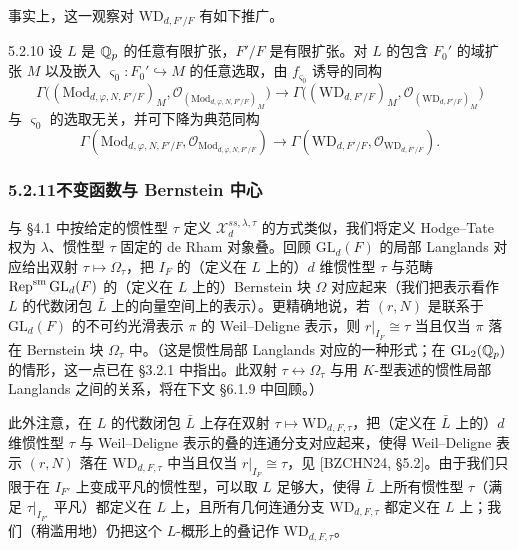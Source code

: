 事实上，这一观察对 $\mathrm{WD}_{d,F'/F}$ 有如下推广。

\begin{prop}{5.2.10}
设 $L$ 是 $\mathbb{Q}_p$ 的任意有限扩张，$F'/F$ 是有限扩张。对 $L$ 的包含 $F_0'$ 的域扩张 $M$ 以及嵌入 $\varsigma_0: F_0'\hookrightarrow M$ 的任意选取，由 $f_{\varsigma_0}$ 诱导的同构
\[
\Gamma\bigl((\mathrm{Mod}_{d,\varphi,N,F'/F})_M,\mathcal{O}_{(\mathrm{Mod}_{d,\varphi,N,F'/F})_M}\bigr)\longrightarrow\Gamma\bigl((\mathrm{WD}_{d,F'/F})_M,\mathcal{O}_{(\mathrm{WD}_{d,F'/F})_M}\bigr)
\]
与 $\varsigma_0$ 的选取无关，并可下降为典范同构
\[
\Gamma(\mathrm{Mod}_{d,\varphi,N,F'/F},\mathcal{O}_{\mathrm{Mod}_{d,\varphi,N,F'/F}})\longrightarrow\Gamma(\mathrm{WD}_{d,F'/F},\mathcal{O}_{\mathrm{WD}_{d,F'/F}}).
\]
\label{thm:a4-5-2-10}
\end{prop}

\subsubsection*{5.2.11\quad 不变函数与 Bernstein 中心}

与 §4.1 中按给定的惯性型 $\tau$ 定义 $\mathcal{X}^{ss,\lambda,\tau}_d$ 的方式类似，我们将定义 Hodge--Tate 权为 $\lambda$、惯性型 $\tau$ 固定的 de Rham 对象叠。回顾 $\mathrm{GL}_d(F)$ 的局部 Langlands 对应给出双射 $\tau\mapsto\Omega_\tau$，把 $I_F$ 的（定义在 $L$ 上的）$d$ 维惯性型 $\tau$ 与范畴 $\operatorname{Rep}^{\mathrm{sm}}\mathrm{GL}_d(F)$ 的（定义在 $L$ 上的）Bernstein 块 $\Omega$ 对应起来（我们把表示看作 $L$ 的代数闭包 $\bar L$ 上的向量空间上的表示）。更精确地说，若 $(r,N)$ 是联系于 $\mathrm{GL}_d(F)$ 的不可约光滑表示 $\pi$ 的 Weil--Deligne 表示，则 $r|_{I_F}\cong\tau$ 当且仅当 $\pi$ 落在 Bernstein 块 $\Omega_\tau$ 中。（这是惯性局部 Langlands 对应的一种形式；在 $\mathrm{GL}_2(\mathbb{Q}_p)$ 的情形，这一点已在 §3.2.1 中指出。此双射 $\tau\leftrightarrow\Omega_\tau$ 与用 $K$-型表述的惯性局部 Langlands 之间的关系，将在下文 §6.1.9 中回顾。）

此外注意，在 $L$ 的代数闭包 $\bar L$ 上存在双射 $\tau\mapsto\mathrm{WD}_{d,F,\tau}$，把（定义在 $\bar L$ 上的）$d$ 维惯性型 $\tau$ 与 Weil--Deligne 表示的叠的连通分支对应起来，使得 Weil--Deligne 表示 $(r,N)$ 落在 $\mathrm{WD}_{d,F,\tau}$ 中当且仅当 $r|_{I_F}\cong\tau$，见 [BZCHN24, §5.2]。由于我们只限于在 $I_{F'}$ 上变成平凡的惯性型，可以取 $L$ 足够大，使得 $\bar L$ 上所有惯性型 $\tau$（满足 $\tau|_{I_{F'}}$ 平凡）都定义在 $L$ 上，且所有几何连通分支 $\mathrm{WD}_{d,F,\tau}$ 都定义在 $L$ 上；我们（稍滥用地）仍把这个 $L$-概形上的叠记作 $\mathrm{WD}_{d,F,\tau}$。

